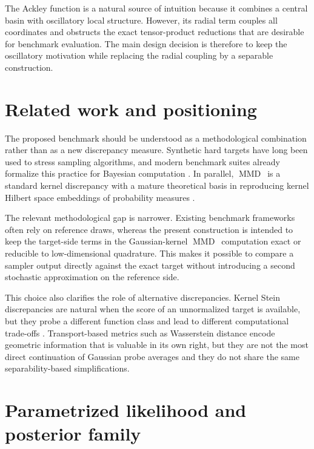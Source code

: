 \documentclass[11pt,a4paper]{article}
\DeclareMathOperator{\MMDop}{MMD}
\newcommand{\MMD}{\ensuremath{\MMDop}\xspace}
\begin{document}
The Ackley function is a natural source of intuition because it combines a central basin with oscillatory local structure. However, its radial term couples all coordinates and obstructs the exact tensor-product reductions that are desirable for benchmark evaluation. The main design decision is therefore to keep the oscillatory motivation while replacing the radial coupling by a separable construction.

\section{Related work and positioning}

The proposed benchmark should be understood as a methodological combination rather than as a new discrepancy measure. Synthetic hard targets have long been used to stress sampling algorithms, and modern benchmark suites already formalize this practice for Bayesian computation \parencite{Magnusson2025PosteriorDB,Ding2025MCBench}. In parallel, \MMD\ is a standard kernel discrepancy with a mature theoretical basis in reproducing kernel Hilbert space embeddings of probability measures \parencite{Gretton2012,Sriperumbudur2010Hilbert,Sriperumbudur2011Universality}. 

The relevant methodological gap is narrower. Existing benchmark frameworks often rely on reference draws, whereas the present construction is intended to keep the target-side terms in the Gaussian-kernel \MMD\ computation exact or reducible to low-dimensional quadrature. This makes it possible to compare a sampler output directly against the exact target without introducing a second stochastic approximation on the reference side.

This choice also clarifies the role of alternative discrepancies. Kernel Stein discrepancies are natural when the score of an unnormalized target is available, but they probe a different function class and lead to different computational trade-offs \parencite{Liu2016KSD,Kalinke2025NystromKSD}. Transport-based metrics such as Wasserstein distance encode geometric information that is valuable in its own right, but they are not the most direct continuation of Gaussian probe averages and they do not share the same separability-based simplifications.

\section{Parametrized likelihood and posterior family}
\end{document}
